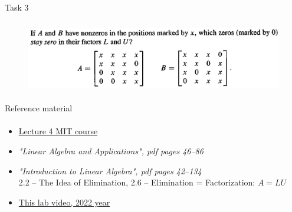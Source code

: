 \documentclass[aspectratio=169]{beamer}
\begin{document}
\begin{frame}[t]{Task 3}
    \framesubtitle{}
    \begin{figure}[H]
        \centering\includegraphics[height=3cm,width=1\textwidth,keepaspectratio]{3.png}
        \label{fig:3.png}
    \end{figure}
\end{frame}



\begin{frame}[t]{Reference material}
    \framesubtitle{}
    \Large
    \begin{itemize}
        \item \href{https://ocw.mit.edu/courses/mathematics/18-06-linear-algebra-spring-2010/video-lectures/lecture-4-factorization-into-a-lu/}{Lecture 4 MIT course}
        \item \textit{"Linear Algebra and Applications", pdf pages 46--86 }
        \item \textit{"Introduction to Linear Algebra", pdf pages 42--134 }\\  2.2 -- The Idea of Elimination, 2.6 -- Elimination = Factorization: $A=LU$
        \item \href{https://youtu.be/OJPX6wINxBU}{This lab video, 2022 year}
    \end{itemize}
\end{frame}
\end{document}
